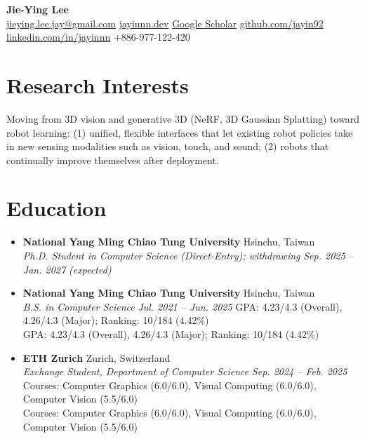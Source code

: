 \documentclass[a4paper,10pt]{extarticle}
\newenvironment{cvlist}
  {\begin{itemize}[leftmargin=1em, itemsep=2pt, topsep=0pt, parsep=0pt, label=\textbullet]}
  {\end{itemize}}
\newcommand{\edu}[5]{%
  \item \textbf{#1} \hfill #2\\
  \textit{#3} \hfill \textit{#4}%
  \ifx\relax#5\relax\else\\#5\fi}
\begin{document}
\begin{center}
  {\fontsize{24pt}{28pt}\selectfont\bfseries Jie-Ying Lee}\\[5pt]
  \small
  \href{mailto:jieying.lee.jay@gmail.com}{jieying.lee.jay@gmail.com}%
  \enspace\textperiodcentered\enspace \href{https://jayinnn.dev/}{jayinnn.dev}%
  \enspace\textperiodcentered\enspace \href{https://scholar.google.com/citations?user=mKB6voEAAAAJ}{Google Scholar}%
  \enspace\textperiodcentered\enspace \href{https://github.com/jayin92}{github.com/jayin92}%
  \enspace\textperiodcentered\enspace \href{https://www.linkedin.com/in/jayinnn/}{linkedin.com/in/jayinnn}%
  \enspace\textperiodcentered\enspace +886-977-122-420%
\end{center}
\vspace{-6pt}

\section{Research Interests}
{Moving from 3D vision and generative 3D (NeRF, 3D Gaussian Splatting) toward robot learning: (1) unified, flexible interfaces that let existing robot policies take in new sensing modalities such as vision, touch, and sound; (2) robots that continually improve themselves after deployment.}

\section{Education}
\begin{cvlist}
  \edu{National Yang Ming Chiao Tung University}{Hsinchu, Taiwan}
      {Ph.D. Student in Computer Science (Direct-Entry); withdrawing}{Sep. 2025 -- Jan. 2027 (expected)}{}
  \edu{National Yang Ming Chiao Tung University}{Hsinchu, Taiwan}
      {B.S. in Computer Science}{Jul. 2021 -- Jun. 2025}
      {GPA: 4.23/4.3 (Overall), 4.26/4.3 (Major); Ranking: 10/184 (4.42\%)}
  \edu{ETH Zurich}{Zurich, Switzerland}
      {Exchange Student, Department of Computer Science}{Sep. 2024 -- Feb. 2025}
      {Courses: Computer Graphics (6.0/6.0), Visual Computing (6.0/6.0), Computer Vision (5.5/6.0)}
\end{cvlist}

\end{document}
